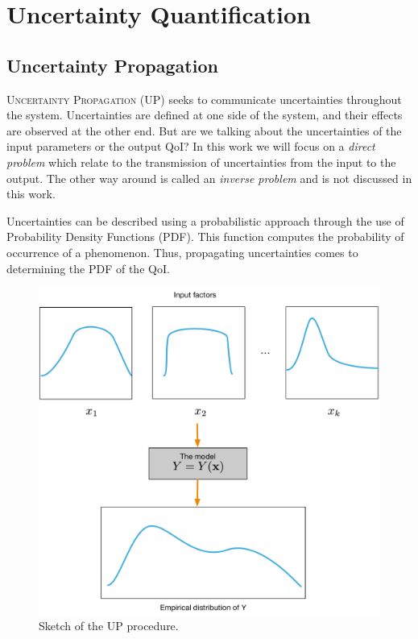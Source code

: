 \section{Uncertainty Quantification}\label{sec:uq}

\subsection{Uncertainty Propagation}\label{sec:up}
\lettrine{U}{ncertainty Propagation} (UP) seeks to communicate uncertainties throughout the system. Uncertainties are defined at one side of the system, and their effects are observed at the other end. But are we talking about the uncertainties of the input parameters or the output QoI? In this work we will focus on a \emph{direct problem} which relate to the transmission of uncertainties from the input to the output. The other way around is called an \emph{inverse problem} and is not discussed in this work.

Uncertainties can be described using a probabilistic approach through the use of Probability Density Functions (PDF). This function computes the probability of occurrence of a phenomenon. Thus, propagating uncertainties comes to determining the PDF of the QoI.

\begin{figure}[!ht]
\centering
\includegraphics[width=0.7\linewidth,keepaspectratio]{fig/literature/propagation.pdf}
\caption{Sketch of the UP procedure.}
\label{fig:UP}
\end{figure}

